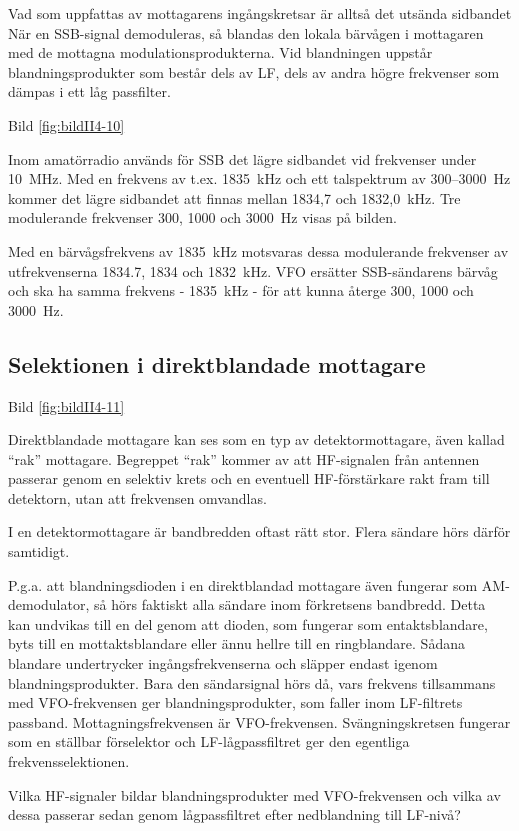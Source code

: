 Vad som uppfattas av mottagarens ingångskretsar är alltså det utsända
sidbandet När en SSB-signal demoduleras, så blandas den lokala
bärvågen i mottagaren med de mottagna modulationsprodukterna.  Vid
blandningen uppstår blandningsprodukter som består dels av LF, dels av
andra högre frekvenser som dämpas i ett låg passfilter.

Bild \ref{fig:bildII4-10}

Inom amatörradio används för SSB det lägre sidbandet vid frekvenser
under 10~MHz.  Med en frekvens av t.ex. 1835~kHz och ett talspektrum
av 300--3000~Hz kommer det lägre sidbandet att finnas mellan 1834,7 och
1832,0~kHz. Tre modulerande frekvenser 300, 1000 och 3000~Hz visas på
bilden.

Med en bärvågsfrekvens av 1835~kHz motsvaras dessa modulerande
frekvenser av utfrekvenserna 1834.7, 1834 och 1832~kHz. VFO ersätter
SSB-sändarens bärvåg och ska ha samma frekvens - 1835~kHz - för att
kunna återge 300, 1000 och 3000~Hz.

\subsection{Selektionen i direktblandade mottagare}

Bild \ref{fig:bildII4-11}

Direktblandade mottagare kan ses som en typ av detektormottagare, även
kallad ``rak'' mottagare. Begreppet ``rak'' kommer av att HF-signalen från
antennen passerar genom en selektiv krets och en eventuell
HF-förstärkare rakt fram till detektorn, utan att frekvensen omvandlas.

I en detektormottagare är bandbredden oftast rätt stor. Flera sändare
hörs därför samtidigt.

P.g.a. att blandningsdioden i en direktblandad mottagare även fungerar
som AM-demodulator, så hörs faktiskt alla sändare inom förkretsens
bandbredd. Detta kan undvikas till en del genom att dioden, som
fungerar som entaktsblandare, byts till en mottaktsblandare eller ännu
hellre till en ringblandare. Sådana blandare undertrycker
ingångsfrekvenserna och släpper endast igenom
blandningsprodukter. Bara den sändarsignal hörs då, vars frekvens
tillsammans med VFO-frekvensen ger blandningsprodukter, som faller
inom LF-filtrets passband. Mottagningsfrekvensen är
VFO-frekvensen. Svängningskretsen fungerar som en ställbar förselektor
och LF-lågpassfiltret ger den egentliga frekvensselektionen.

Vilka HF-signaler bildar blandningsprodukter med VFO-frekvensen och
vilka av dessa passerar sedan genom lågpassfiltret efter nedblandning
till LF-nivå?


